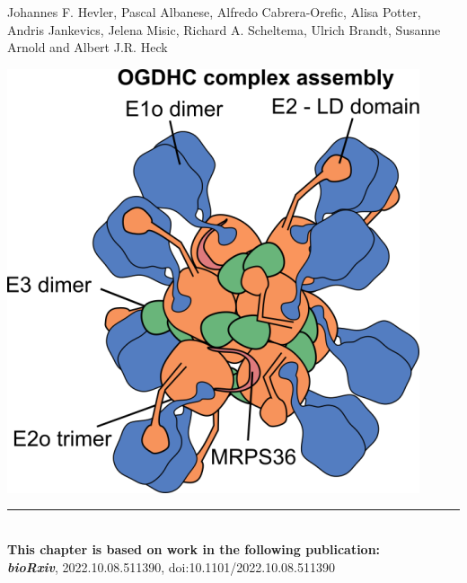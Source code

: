  \label{ch-5}
\vspace*{0.25cm}

{\footnotesize Johannes F. Hevler, Pascal Albanese, Alfredo Cabrera-Orefic, Alisa Potter, Andris Jankevics, Jelena Misic, Richard A. Scheltema, Ulrich Brandt, Susanne Arnold and Albert J.R. Heck}
%
\begin{center}
    \vspace{3cm}
    \includegraphics[]{Chapter.5/Figures/OGDHC_schematic.png}
    \vspace{0.25cm}
\end{center}
%
\begin{flushleft}
    \vspace*{\fill}
    \rule{\textwidth}{1pt}\\[0cm]
    \textbf{This chapter is based on work in the following publication:}\\
    \footnotesize
    \textbf{\emph{bioRxiv}}, 2022.10.08.511390, doi:10.1101/2022.10.08.511390
\end{flushleft}
%
